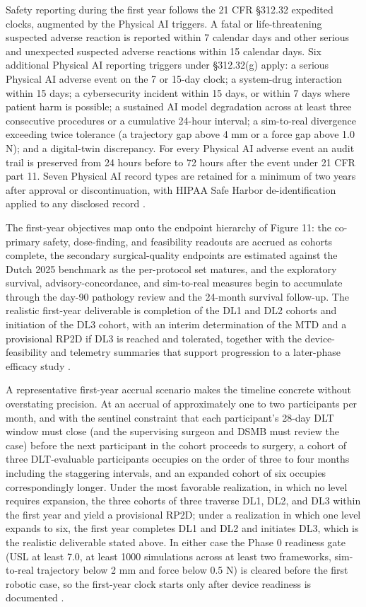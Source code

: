 Safety reporting during the first year follows the 21 CFR \S 312.32 expedited clocks,
augmented by the Physical AI triggers. A fatal or life-threatening suspected adverse
reaction is reported within 7 calendar days and other serious and unexpected
suspected adverse reactions within 15 calendar days. Six additional Physical AI
reporting triggers under \S 312.32(g) apply: a serious Physical AI adverse event on
the 7 or 15-day clock; a system-drug interaction within 15 days; a cybersecurity
incident within 15 days, or within 7 days where patient harm is possible; a sustained
AI model degradation across at least three consecutive procedures or a cumulative
24-hour interval; a sim-to-real divergence exceeding twice tolerance (a trajectory
gap above 4 mm or a force gap above 1.0 N); and a digital-twin discrepancy. For every
Physical AI adverse event an audit trail is preserved from 24 hours before to 72
hours after the event under 21 CFR part 11. Seven Physical AI record types are
retained for a minimum of two years after approval or discontinuation, with HIPAA
Safe Harbor de-identification applied to any disclosed record \cite{cfr312paiuni,congress9510}.

The first-year objectives map onto the endpoint hierarchy of Figure 11: the
co-primary safety, dose-finding, and feasibility readouts are accrued as cohorts
complete, the secondary surgical-quality endpoints are estimated against the Dutch
2025 benchmark as the per-protocol set matures, and the exploratory survival,
advisory-concordance, and sim-to-real measures begin to accumulate through the day-90
pathology review and the 24-month survival follow-up. The realistic first-year
deliverable is completion of the DL1 and DL2 cohorts and initiation of the DL3
cohort, with an interim determination of the MTD and a provisional RP2D if DL3 is
reached and tolerated, together with the device-feasibility and telemetry summaries
that support progression to a later-phase efficacy study \cite{daraxwhipple}.

A representative first-year accrual scenario makes the timeline concrete without
overstating precision. At an accrual of approximately one to two participants per
month, and with the sentinel constraint that each participant's 28-day DLT window
must close (and the supervising surgeon and DSMB must review the case) before the
next participant in the cohort proceeds to surgery, a cohort of three DLT-evaluable
participants occupies on the order of three to four months including the staggering
intervals, and an expanded cohort of six occupies correspondingly longer. Under the
most favorable realization, in which no level requires expansion, the three cohorts
of three traverse DL1, DL2, and DL3 within the first year and yield a provisional
RP2D; under a realization in which one level expands to six, the first year completes
DL1 and DL2 and initiates DL3, which is the realistic deliverable stated above. In
either case the Phase 0 readiness gate (USL at least 7.0, at least 1000 simulations
across at least two frameworks, sim-to-real trajectory below 2 mm and force below
0.5 N) is cleared before the first robotic case, so the first-year clock starts only
after device readiness is documented \cite{phase1guidance,onpremwhippl}.

